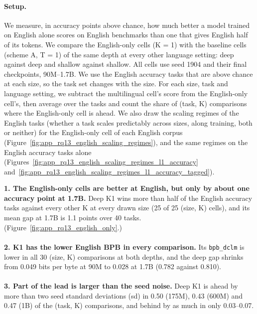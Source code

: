 {\begin{minipage}[t]{0.485\textwidth}
\paragraph{Setup.} We measure, in accuracy points above chance, how much better a model trained on English alone scores on English benchmarks than one that gives English half of its tokens. We compare the English-only cells (K = 1) with the baseline cells (scheme A, T = 1) of the same depth at every other language setting: deep against deep and shallow against shallow. All cells use seed 1904 and their final checkpoints, 90M--1.7B. We use the English accuracy tasks that are above chance at each size, so the task set changes with the size. For each size, task and language setting, we subtract the multilingual cell's score from the English-only cell's, then average over the tasks and count the share of (task, K) comparisons where the English-only cell is ahead. We also draw the scaling regimes of the English tasks (whether a task scales predictably across sizes, along training, both or neither) for the English-only cell of each English corpus (Figure~\ref{fig:app_rq13_english_scaling_regimes}), and the same regimes on the English accuracy tasks alone (Figures~\ref{fig:app_rq13_english_scaling_regimes_l1_accuracy} and~\ref{fig:app_rq13_english_scaling_regimes_l1_accuracy_tagged}).
\end{minipage}\hfill
\begin{minipage}[t]{0.485\textwidth}
\vspace{0pt}
\begin{rqfinding}
\textbf{1. The English-only cells are better at English, but only by about one accuracy point at 1.7B.} Deep K1 wins more than half of the English accuracy tasks against every other K at every drawn size (25 of 25 (size, K) cells), and its mean gap at 1.7B is 1.1 points over 40 tasks. (Figure~\ref{fig:app_rq13_english_only}.)
\\
\\
\textbf{2. K1 has the lower English BPB in every comparison.} Its \texttt{bpb\_dclm} is lower in all 30 (size, K) comparisons at both depths, and the deep gap shrinks from 0.049 bits per byte at 90M to 0.028 at 1.7B (0.782 against 0.810).
\\
\\
\textbf{3. Part of the lead is larger than the seed noise.} Deep K1 is ahead by more than two seed standard deviations (sd) in 0.50 (175M), 0.43 (600M) and 0.47 (1B) of the (task, K) comparisons, and behind by as much in only 0.03--0.07.
\end{rqfinding}
\end{minipage}

}
